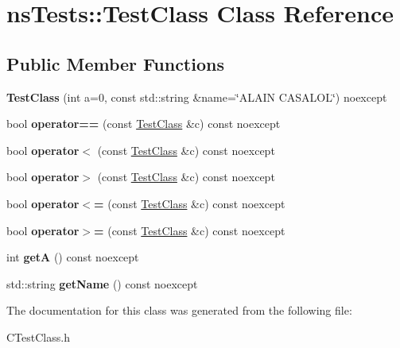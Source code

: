 \hypertarget{classnsTests_1_1TestClass}{\section{ns\+Tests\+:\+:Test\+Class Class Reference}
\label{classnsTests_1_1TestClass}
}
\subsection*{Public Member Functions}
\begin{DoxyCompactItemize}
\item 
\hypertarget{classnsTests_1_1TestClass_a7652415ca2125682f509bcdf5912a396}{{\bfseries Test\+Class} (int a=0, const std\+::string \&name=\char`\"{}A\+L\+A\+I\+N C\+A\+S\+A\+L\+O\+L\char`\"{}) noexcept}\label{classnsTests_1_1TestClass_a7652415ca2125682f509bcdf5912a396}

\item 
\hypertarget{classnsTests_1_1TestClass_abfb7e123e80c807bf971319515409dd3}{bool {\bfseries operator==} (const \hyperlink{classnsTests_1_1TestClass}{Test\+Class} \&c) const noexcept}\label{classnsTests_1_1TestClass_abfb7e123e80c807bf971319515409dd3}

\item 
\hypertarget{classnsTests_1_1TestClass_ac0fb55f716be67d2c9c90f2cf08b1f33}{bool {\bfseries operator$<$} (const \hyperlink{classnsTests_1_1TestClass}{Test\+Class} \&c) const noexcept}\label{classnsTests_1_1TestClass_ac0fb55f716be67d2c9c90f2cf08b1f33}

\item 
\hypertarget{classnsTests_1_1TestClass_ad3afb4282f87d31247c2f6fd361661c8}{bool {\bfseries operator$>$} (const \hyperlink{classnsTests_1_1TestClass}{Test\+Class} \&c) const noexcept}\label{classnsTests_1_1TestClass_ad3afb4282f87d31247c2f6fd361661c8}

\item 
\hypertarget{classnsTests_1_1TestClass_a0eb60884a1a4338cbb512a148965a4af}{bool {\bfseries operator$<$=} (const \hyperlink{classnsTests_1_1TestClass}{Test\+Class} \&c) const noexcept}\label{classnsTests_1_1TestClass_a0eb60884a1a4338cbb512a148965a4af}

\item 
\hypertarget{classnsTests_1_1TestClass_ac9969dd1b6aafd0d50967b8f85ce2815}{bool {\bfseries operator$>$=} (const \hyperlink{classnsTests_1_1TestClass}{Test\+Class} \&c) const noexcept}\label{classnsTests_1_1TestClass_ac9969dd1b6aafd0d50967b8f85ce2815}

\item 
\hypertarget{classnsTests_1_1TestClass_a1ad8fa5a5508399ac32a6d6131d63d6c}{int {\bfseries get\+A} () const noexcept}\label{classnsTests_1_1TestClass_a1ad8fa5a5508399ac32a6d6131d63d6c}

\item 
\hypertarget{classnsTests_1_1TestClass_a7ef790d91e86ca941ec8113496bee24f}{std\+::string {\bfseries get\+Name} () const noexcept}\label{classnsTests_1_1TestClass_a7ef790d91e86ca941ec8113496bee24f}

\end{DoxyCompactItemize}


The documentation for this class was generated from the following file\+:\begin{DoxyCompactItemize}
\item 
C\+Test\+Class.\+h\end{DoxyCompactItemize}
